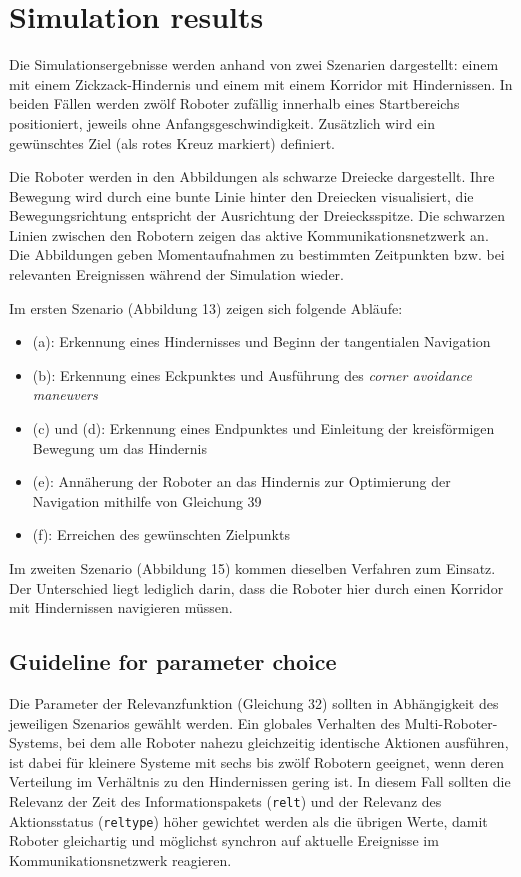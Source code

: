 \documentclass[conference]{IEEEtran}
\begin{document}
\section{Simulation results}
Die Simulationsergebnisse werden anhand von zwei Szenarien dargestellt: 
einem mit einem Zickzack-Hindernis und einem mit einem Korridor mit Hindernissen. 
In beiden Fällen werden zwölf Roboter zufällig 
innerhalb eines Startbereichs positioniert, jeweils ohne Anfangsgeschwindigkeit. 
Zusätzlich wird ein gewünschtes Ziel (als rotes Kreuz markiert) definiert.

Die Roboter werden in den Abbildungen als schwarze Dreiecke dargestellt. 
Ihre Bewegung wird durch eine bunte Linie hinter den Dreiecken visualisiert, 
die Bewegungsrichtung entspricht der Ausrichtung der Dreiecksspitze. Die schwarzen 
Linien zwischen den Robotern zeigen das aktive Kommunikationsnetzwerk an. 
Die Abbildungen geben Momentaufnahmen zu bestimmten Zeitpunkten bzw. 
bei relevanten Ereignissen während der Simulation wieder.

Im ersten Szenario (Abbildung 13) zeigen sich folgende Abläufe:
\begin{itemize}
\item (a): Erkennung eines Hindernisses und Beginn der tangentialen Navigation
\item (b): Erkennung eines Eckpunktes und Ausführung des \textit{corner avoidance maneuvers}
\item (c) und (d): Erkennung eines Endpunktes und Einleitung der kreisförmigen Bewegung um das Hindernis
\item (e): Annäherung der Roboter an das Hindernis zur Optimierung der Navigation mithilfe von Gleichung 39
\item (f): Erreichen des gewünschten Zielpunkts
\end{itemize}

Im zweiten Szenario (Abbildung 15) kommen dieselben Verfahren zum Einsatz. 
Der Unterschied liegt lediglich darin, dass die Roboter hier durch einen Korridor mit Hindernissen navigieren müssen.

\subsection*{Guideline for parameter choice}
Die Parameter der Relevanzfunktion (Gleichung 32) sollten in Abhängigkeit des 
jeweiligen Szenarios gewählt werden. Ein globales Verhalten des 
Multi-Roboter-Systems, bei dem alle Roboter nahezu gleichzeitig identische 
Aktionen ausführen, ist dabei für kleinere Systeme mit sechs bis zwölf 
Robotern geeignet, wenn deren Verteilung im Verhältnis zu den Hindernissen 
gering ist. In diesem Fall sollten die Relevanz der Zeit des Informationspakets 
(\texttt{relt}) und der Relevanz des Aktionsstatus (\texttt{reltype}) höher 
gewichtet werden als die übrigen Werte, damit Roboter gleichartig und möglichst
synchron auf aktuelle Ereignisse im Kommunikationsnetzwerk reagieren.
\end{document}
